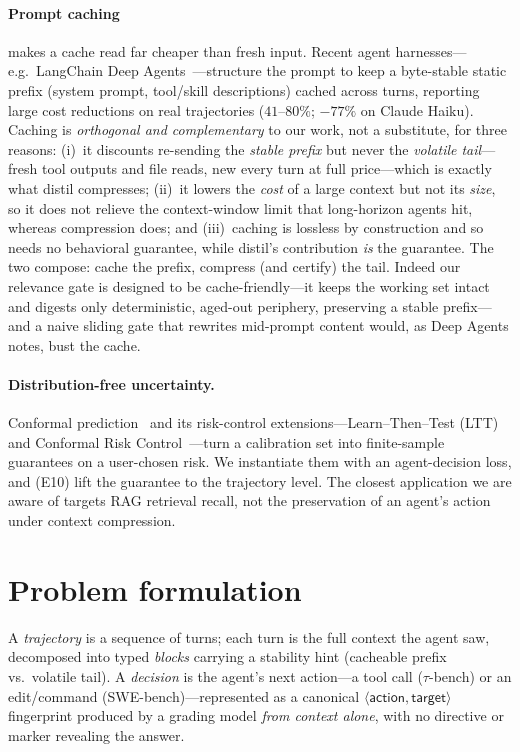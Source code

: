 \documentclass[11pt]{article}
\begin{document}
\paragraph{Prompt caching} makes a cache read far cheaper than fresh input. Recent agent
harnesses---e.g.\ LangChain Deep Agents~\cite{deepagents}---structure the prompt to keep a
byte-stable static prefix (system prompt, tool/skill descriptions) cached across turns,
reporting large cost reductions on real trajectories ($41$--$80\%$; $-77\%$ on Claude Haiku).
Caching is \emph{orthogonal and complementary} to our work, not a substitute, for three
reasons: (i)~it discounts re-sending the \emph{stable prefix} but never the \emph{volatile
tail}---fresh tool outputs and file reads, new every turn at full price---which is exactly
what distil compresses; (ii)~it lowers the \emph{cost} of a large context but not its
\emph{size}, so it does not relieve the context-window limit that long-horizon agents hit,
whereas compression does; and (iii)~caching is lossless by construction and so needs no
behavioral guarantee, while distil's contribution \emph{is} the guarantee. The two compose:
cache the prefix, compress (and certify) the tail. Indeed our relevance gate is designed to
be cache-friendly---it keeps the working set intact and digests only deterministic, aged-out
periphery, preserving a stable prefix---and a naive sliding gate that rewrites mid-prompt
content would, as Deep Agents notes, bust the cache.
\paragraph{Distribution-free uncertainty.} Conformal prediction~\cite{vovk} and its
risk-control extensions---Learn--Then--Test (LTT)~\cite{ltt} and Conformal Risk
Control~\cite{crc}---turn a calibration set into finite-sample guarantees on a
user-chosen risk. We instantiate them with an agent-decision loss, and (E10) lift the
guarantee to the trajectory level. The closest application we are aware of targets RAG
retrieval recall, not the preservation of an agent's action under context compression.

\section{Problem formulation}
\label{sec:problem}
A \emph{trajectory} is a sequence of turns; each turn is the full context the agent
saw, decomposed into typed \emph{blocks} carrying a stability hint (cacheable prefix
vs.\ volatile tail). A \emph{decision} is the agent's next action---a tool call
($\tau$-bench) or an edit/command (SWE-bench)---represented as a canonical
$\langle\textsf{action},\textsf{target}\rangle$ fingerprint produced by a grading
model \emph{from context alone}, with no directive or marker revealing the answer.
\end{document}
